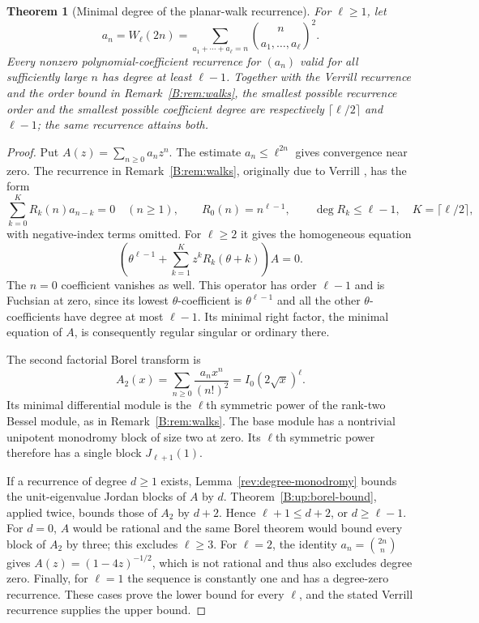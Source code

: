 \documentclass[11pt,a4paper]{article}
\newtheorem{theorem}{Theorem}[section]
\theoremstyle{definition}
\theoremstyle{remark}
\numberwithin{equation}{section}
\begin{document}
\begin{theorem}[Minimal degree of the planar-walk recurrence]
\label{rev:verrill-min-degree}
For $\ell\ge1$, let
\[
 a_n=W_\ell(2n)=
 \sum_{a_1+\cdots+a_\ell=n}\binom{n}{a_1,\ldots,a_\ell}^{\!2}.
\]
Every nonzero polynomial-coefficient recurrence for $(a_n)$ valid for
all sufficiently large $n$ has degree at least $\ell-1$.
Together with the Verrill recurrence and the order bound in
Remark~\ref{B:rem:walks}, the smallest possible recurrence order and
the smallest possible coefficient degree are respectively
$\lceil\ell/2\rceil$ and $\ell-1$; the same recurrence attains both.
\end{theorem}
\begin{proof}
Put $A(z)=\sum_{n\ge0}a_nz^n$. The estimate $a_n\le\ell^{2n}$
gives convergence near zero. The recurrence in
Remark~\ref{B:rem:walks}, originally due to Verrill
\cite{Ver04,BNSW11}, has the form
\[
 \sum_{k=0}^K R_k(n)a_{n-k}=0\quad(n\ge1),\qquad
 R_0(n)=n^{\ell-1},\qquad \deg R_k\le\ell-1,
 \quad K=\lceil\ell/2\rceil,
\]
with negative-index terms omitted. For $\ell\ge2$ it gives the
homogeneous equation
\[
 \left(\theta^{\ell-1}
       +\sum_{k=1}^K z^kR_k(\theta+k)\right)A=0.
\]
The $n=0$ coefficient vanishes as well. This operator has order
$\ell-1$ and is Fuchsian at zero, since its lowest
$\theta$-coefficient is $\theta^{\ell-1}$ and all the other
$\theta$-coefficients have degree at most $\ell-1$.
Its minimal right factor, the minimal equation of $A$, is consequently
regular singular or ordinary there.

The second factorial Borel transform is
\[
 A_2(x)=\sum_{n\ge0}\frac{a_nx^n}{(n!)^2}
                 = I_0(2\sqrt{x})^\ell.
\]
Its minimal differential module is the $\ell$th symmetric power of
the rank-two Bessel module, as in Remark~\ref{B:rem:walks}.
The base module has a nontrivial unipotent monodromy block of size two
at zero. Its $\ell$th symmetric power therefore has a single block
$J_{\ell+1}(1)$.

If a recurrence of degree $d\ge1$ exists, Lemma~\ref{rev:degree-monodromy}
bounds the unit-eigenvalue Jordan blocks of $A$ by $d$.
Theorem~\ref{B:up:borel-bound}, applied twice, bounds those of $A_2$
by $d+2$. Hence $\ell+1\le d+2$, or $d\ge\ell-1$.
For $d=0$, $A$ would be rational and the same Borel theorem would
bound every block of $A_2$ by three; this excludes $\ell\ge3$.
For $\ell=2$, the identity
$a_n=\binom{2n}{n}$ gives $A(z)=(1-4z)^{-1/2}$, which is not
rational and thus also excludes degree zero.
Finally, for $\ell=1$ the sequence is constantly one and has a
degree-zero recurrence. These cases prove the lower bound for every
$\ell$, and the stated Verrill recurrence supplies the upper bound.
\end{proof}
\end{document}
